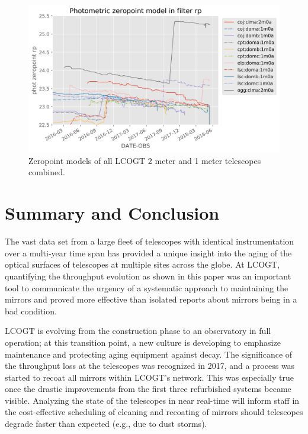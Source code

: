 \documentclass[]{spieman}
\begin{document}
\begin{figure}
\includegraphics[width=\textwidth]{images/allmodels__2m0a_1m0a__rp.png}
\caption{\label{fig_alltelescopes} Zeropoint models of all LCOGT 2 meter and 1 meter telescopes combined. }
\end{figure}






\section{Summary and Conclusion}

The vast data set from a large fleet of telescopes with identical instrumentation over a multi-year
time span has provided a unique insight into the aging of the optical surfaces of telescopes at
multiple sites across the globe. At LCOGT, quantifying the throughput evolution as shown in this
paper was an important tool to communicate the urgency of a systematic approach to maintaining the
mirrors and proved more effective than isolated reports about mirrors being in a bad condition.

LCOGT is evolving from the construction phase to an observatory in full operation; at this
transition point, a new culture is developing to emphasize maintenance and protecting aging equipment
against decay. The significance of the throughput loss at the telescopes was recognized in 2017, and
a process was started to recoat all mirrors within LCOGT's network.  This was especially true once
the drastic improvements from the first three refurbished systems became visible.  Analyzing the
state of the telescopes in near real-time will inform staff in the cost-effective scheduling of
cleaning and recoating of mirrors should telescopes degrade faster than expected (e.g., due to dust
storms).
\end{document}

